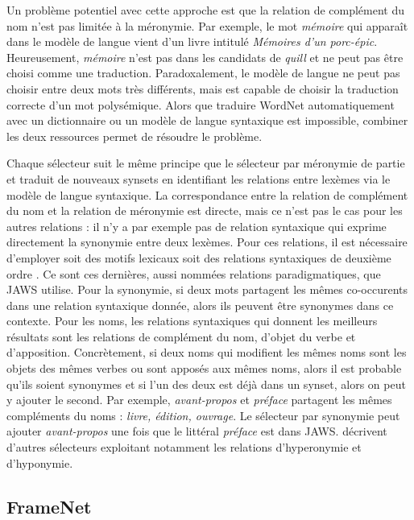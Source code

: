 Un problème potentiel avec cette approche est que la relation de complément du nom n'est pas limitée à la méronymie. Par exemple, le mot \textit{mémoire} qui apparaît dans le modèle de langue vient d'un livre intitulé \textit{Mémoires d'un porc-épic}. Heureusement, \textit{mémoire} n'est pas dans les candidats de \textit{quill} et ne peut pas être choisi comme une traduction. Paradoxalement, le modèle de langue ne peut pas choisir entre deux mots très différents, mais est capable de choisir la traduction correcte d'un mot polysémique. Alors que traduire WordNet automatiquement avec un dictionnaire ou un modèle de langue syntaxique est impossible, combiner les deux ressources permet de résoudre le problème.

Chaque sélecteur suit le même principe que le sélecteur par méronymie de partie et traduit de nouveaux synsets en identifiant les relations entre lexèmes via le modèle de langue syntaxique. La correspondance entre la relation de complément du nom et la relation de méronymie est directe, mais ce n'est pas le cas pour les autres relations : il n'y a par exemple pas de relation syntaxique qui exprime directement la synonymie entre deux lexèmes. Pour ces relations, il est nécessaire d'employer soit des motifs lexicaux \citep{hearst1992automatic} soit des relations syntaxiques de deuxième ordre \citep{lenci2012identifying}. Ce sont ces dernières, aussi nommées relations paradigmatiques, que JAWS utilise. Pour la synonymie, si deux mots partagent les mêmes co-occurents dans une relation syntaxique donnée, alors ils peuvent être synonymes dans ce contexte. Pour les noms, les relations syntaxiques qui donnent les meilleurs résultats sont les relations de complément du nom, d'objet du verbe et d'apposition. Concrètement, si deux noms qui modifient les mêmes noms sont les objets des mêmes verbes ou sont apposés aux mêmes noms, alors il est probable qu'ils soient synonymes et si l'un des deux est déjà dans un synset, alors on peut y ajouter le second. Par exemple, \textit{avant-propos} et \textit{préface} partagent les mêmes compléments du noms : \textit{livre, édition, ouvrage}. Le sélecteur par synonymie peut ajouter \textit{avant-propos} une fois que le littéral \textit{préface} est dans JAWS. \citep{mouton2010jaws,mouton2010phd} décrivent d'autres sélecteurs exploitant notamment les relations d'hyperonymie et d'hyponymie.

\subsection{FrameNet}

